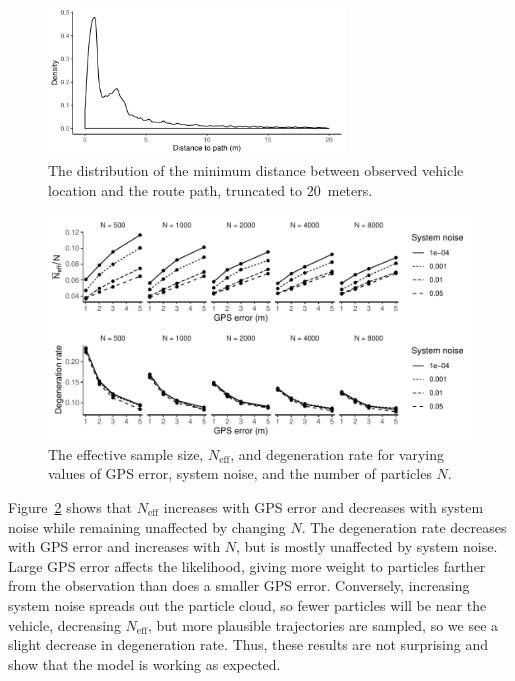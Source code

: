 \begin{figure}[tb]
    \centering
    \includegraphics[width=0.7\textwidth]{figures/04_model_results_dist.pdf}
    \caption{
        The distribution of the minimum distance between observed vehicle location
        and the route path, truncated to 20~meters.
    }
    \label{fig:dist_to_route}
\end{figure}


\begin{figure}[tb]
    \centering
    \includegraphics[width=\textwidth]{figures/04_model_results_neff.pdf}
    \caption{
        The effective sample size, $N_\text{eff}$,
        and degeneration rate for varying values of GPS error,
        system noise, and the number of particles $N$.
    }
    \label{fig:perf_stats}
\end{figure}


Figure~\ref{fig:perf_stats} shows that $N_\text{eff}$ increases
with GPS error and decreases with system noise
while remaining unaffected by changing $N$.
The degeneration rate decreases with GPS error and increases with $N$,
but is mostly unaffected by system noise.
Large GPS error affects the likelihood,
giving more weight to particles farther from the observation
than does a smaller GPS error.
Conversely, increasing system noise spreads out the particle cloud,
so fewer particles will be near the vehicle,
decreasing $N_\text{eff}$,
but more plausible trajectories are sampled,
so we see a slight decrease in degeneration rate.
Thus, these results are not surprising
and show that the model is working as expected.


